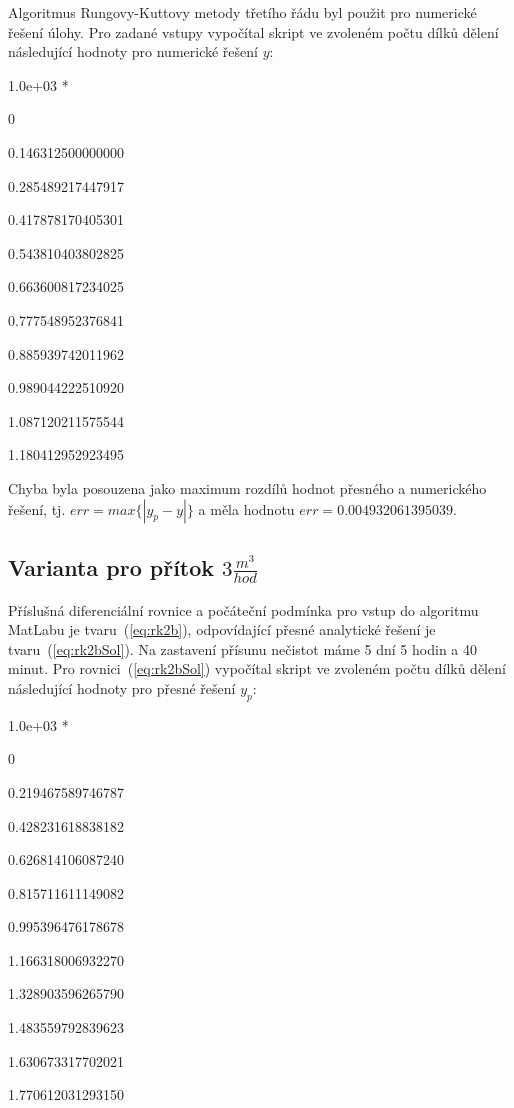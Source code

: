 \documentclass[a4paper,12pt]{article}
\begin{document}
   Algoritmus Rungovy-Kuttovy metody třetího řádu byl použit pro numerické řešení úlohy. Pro zadané vstupy vypočítal skript ve zvoleném počtu dílků dělení následující hodnoty pro numerické řešení $y$:\bigskip
   
   1.0e+03 *\par

                   0\par
   0.146312500000000\par
   0.285489217447917\par
   0.417878170405301\par
   0.543810403802825\par
   0.663600817234025\par
   0.777548952376841\par
   0.885939742011962\par
   0.989044222510920\par
   1.087120211575544\par
   1.180412952923495\bigskip
   
   Chyba byla posouzena jako maximum rozdílů hodnot přesného a numerického řešení, tj. $err=max\{\left|y_p-y\right|\}$ a měla hodnotu $err=0.004932061395039$.
   
   \subsection{Varianta pro přítok $3\frac{m^3}{hod}$}
Příslušná diferenciální rovnice a počáteční podmínka pro vstup do algoritmu MatLabu je tvaru~(\ref{eq:rk2b}), odpovídající přesné analytické řešení je tvaru~(\ref{eq:rk2bSol}). Na zastavení přísunu nečistot máme 5 dní 5 hodin a 40 minut. Pro rovnici~(\ref{eq:rk2bSol}) vypočítal skript ve zvoleném počtu dílků dělení následující hodnoty pro přesné řešení $y_p$:\bigskip 

 1.0e+03 *\par

                   0\par
   0.219467589746787\par
   0.428231618838182\par
   0.626814106087240\par
   0.815711611149082\par
   0.995396476178678\par
   1.166318006932270\par
   1.328903596265790\par
   1.483559792839623\par
   1.630673317702021\par
   1.770612031293150\bigskip
   
\end{document}
